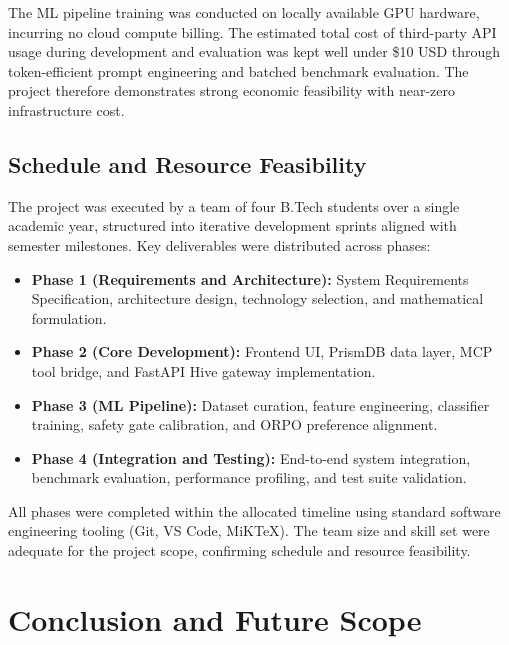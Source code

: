 \documentclass[12pt,a4paper]{report}
\begin{document}
The ML pipeline training was conducted on locally available GPU hardware, incurring no cloud compute billing. The estimated total cost of third-party API usage during development and evaluation was kept well under \$10 USD through token-efficient prompt engineering and batched benchmark evaluation. The project therefore demonstrates strong economic feasibility with near-zero infrastructure cost.

\section{Schedule and Resource Feasibility}
The project was executed by a team of four B.Tech students over a single academic year, structured into iterative development sprints aligned with semester milestones. Key deliverables were distributed across phases:

\begin{itemize}\setlength{\itemsep}{2pt}\setlength{\parskip}{0pt}
    \item \textbf{Phase 1 (Requirements and Architecture):} System Requirements Specification, architecture design, technology selection, and mathematical formulation.
    \item \textbf{Phase 2 (Core Development):} Frontend UI, PrismDB data layer, MCP tool bridge, and FastAPI Hive gateway implementation.
    \item \textbf{Phase 3 (ML Pipeline):} Dataset curation, feature engineering, classifier training, safety gate calibration, and ORPO preference alignment.
    \item \textbf{Phase 4 (Integration and Testing):} End-to-end system integration, benchmark evaluation, performance profiling, and test suite validation.
\end{itemize}

All phases were completed within the allocated timeline using standard software engineering tooling (Git, VS Code, MiKTeX). The team size and skill set were adequate for the project scope, confirming schedule and resource feasibility.

\chapter{Conclusion and Future Scope}
\end{document}
